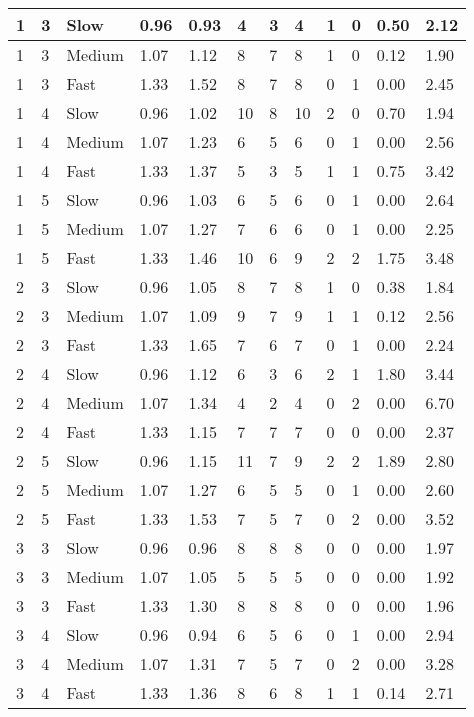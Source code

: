 \documentclass[10pt,fleqn,a4paper]{article}
\begin{document}
{\begin{tabular}{|p{0.5cm}|p{1cm}|p{1.0cm}|p{1.5cm}|p{1.2cm}|p{1.2cm}|p{1.2cm}|p{1.2cm}|p{1.2cm}|p{1.2cm}|p{1.2cm}|p{1.2cm}|}
1 & 3 & Slow & 0.96 & 0.93 & 4 & 3 & 4 & 1 & 0 & 0.50 & 2.12 \\ \hline
1 & 3 & Medium & 1.07 & 1.12 & 8 & 7 & 8 & 1 & 0 & 0.12 & 1.90 \\ \hline
1 & 3 & Fast & 1.33 & 1.52 & 8 & 7 & 8 & 0 & 1 & 0.00 & 2.45 \\ \hline
1 & 4 & Slow & 0.96 & 1.02 & 10 & 8 & 10 & 2 & 0 & 0.70 & 1.94 \\ \hline
1 & 4 & Medium & 1.07 & 1.23 & 6 & 5 & 6 & 0 & 1 & 0.00 & 2.56 \\ \hline
1 & 4 & Fast & 1.33 & 1.37 & 5 & 3 & 5 & 1 & 1 & 0.75 & 3.42 \\ \hline
1 & 5 & Slow & 0.96 & 1.03 & 6 & 5 & 6 & 0 & 1 & 0.00 & 2.64 \\ \hline
1 & 5 & Medium & 1.07 & 1.27 & 7 & 6 & 6 & 0 & 1 & 0.00 & 2.25 \\ \hline
1 & 5 & Fast & 1.33 & 1.46 & 10 & 6 & 9 & 2 & 2 & 1.75 & 3.48 \\ \hline
2 & 3 & Slow & 0.96 & 1.05 & 8 & 7 & 8 & 1 & 0 & 0.38 & 1.84 \\ \hline
2 & 3 & Medium & 1.07 & 1.09 & 9 & 7 & 9 & 1 & 1 & 0.12 & 2.56 \\ \hline
2 & 3 & Fast & 1.33 & 1.65 & 7 & 6 & 7 & 0 & 1 & 0.00 & 2.24 \\ \hline
2 & 4 & Slow & 0.96 & 1.12 & 6 & 3 & 6 & 2 & 1 & 1.80 & 3.44 \\ \hline
2 & 4 & Medium & 1.07 & 1.34 & 4 & 2 & 4 & 0 & 2 & 0.00 & 6.70 \\ \hline
2 & 4 & Fast & 1.33 & 1.15 & 7 & 7 & 7 & 0 & 0 & 0.00 & 2.37 \\ \hline
2 & 5 & Slow & 0.96 & 1.15 & 11 & 7 & 9 & 2 & 2 & 1.89 & 2.80 \\ \hline
2 & 5 & Medium & 1.07 & 1.27 & 6 & 5 & 5 & 0 & 1 & 0.00 & 2.60 \\ \hline
2 & 5 & Fast & 1.33 & 1.53 & 7 & 5 & 7 & 0 & 2 & 0.00 & 3.52 \\ \hline
3 & 3 & Slow & 0.96 & 0.96 & 8 & 8 & 8 & 0 & 0 & 0.00 & 1.97 \\ \hline
3 & 3 & Medium & 1.07 & 1.05 & 5 & 5 & 5 & 0 & 0 & 0.00 & 1.92 \\ \hline
3 & 3 & Fast & 1.33 & 1.30 & 8 & 8 & 8 & 0 & 0 & 0.00 & 1.96 \\ \hline
3 & 4 & Slow & 0.96 & 0.94 & 6 & 5 & 6 & 0 & 1 & 0.00 & 2.94 \\ \hline
3 & 4 & Medium & 1.07 & 1.31 & 7 & 5 & 7 & 0 & 2 & 0.00 & 3.28 \\ \hline
3 & 4 & Fast & 1.33 & 1.36 & 8 & 6 & 8 & 1 & 1 & 0.14 & 2.71 \\ \hline

\end{tabular}}
\end{document}
